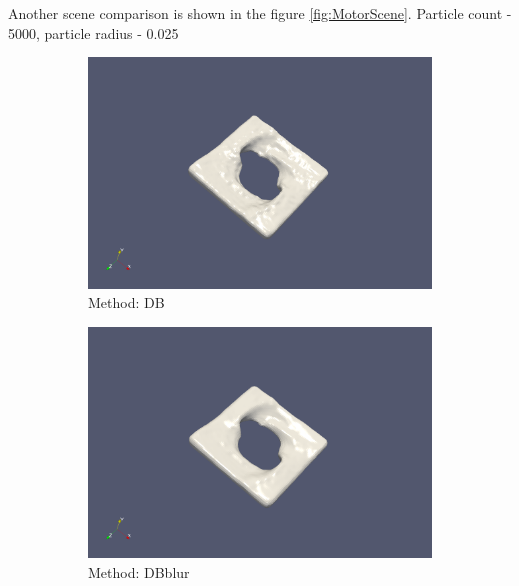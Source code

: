 Another scene comparison is shown in the figure \ref{fig:MotorScene}. Particle count - 5000, particle radius - 0.025
\begin{figure}[h]
	\begin{center}
        \begin{subfigure}[b]{0.4\textwidth}
               \includegraphics[width=\textwidth]{figures/ReconstructionMotorSceneDencityBased.png}
				\caption{Method: DB}
        \end{subfigure}
        \begin{subfigure}[b]{0.4\textwidth}
               \includegraphics[width=\textwidth]{figures/ReconstructionMotorSceneDencityBasedBlur.png}
				\caption{Method: DBblur}
        \end{subfigure}
        \begin{subfigure}[b]{0.4\textwidth}

\end{subfigure}
\end{center}
\end{figure}
